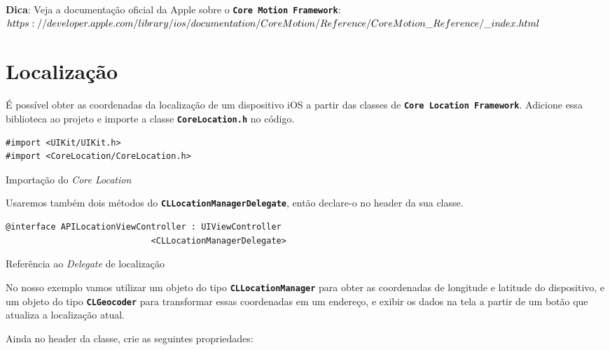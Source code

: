 \documentclass[a4paper,12pt,brazil,doubleside]{book}
\begin{document}
\begin{singlespace}
\begin{framed}

\textbf{Dica}: Veja a documentação oficial da Apple sobre o \texttt{\textbf{Core Motion Framework}}:\\
\(https://developer.apple.com/library/ios/documentation/CoreMotion/Reference/\\CoreMotion\_Reference/\_index.html\)

\end{framed}

\section{Localização}


É possível obter as coordenadas da localização de um dispositivo iOS a partir das classes de \texttt{\textbf{Core Location Framework}}. Adicione essa biblioteca ao projeto e importe a classe \texttt{\textbf{CoreLocation.h}} no código.

\begin{listing}[H]
\begin{verbatim}
#import <UIKit/UIKit.h>
#import <CoreLocation/CoreLocation.h>
\end{verbatim}
\caption{Importação do \emph{Core Location}}
\end{listing}


Usaremos também dois métodos do \texttt{\textbf{CLLocationManagerDelegate}}, então declare-o no header da sua classe.

\begin{listing}[H]
\begin{verbatim}
@interface APILocationViewController : UIViewController
                             <CLLocationManagerDelegate>
\end{verbatim}
\caption{Referência ao \emph{Delegate} de localização}
\end{listing}


No nosso exemplo vamos utilizar um objeto do tipo \texttt{\textbf{CLLocationManager}} para obter as coordenadas de longitude e latitude do dispositivo, e um objeto do tipo \texttt{\textbf{CLGeocoder}} para transformar essas coordenadas em um endereço, e exibir os dados na tela a partir de um botão que atualiza a localização atual.

Ainda no header da classe, crie as seguintes propriedades:


\end{singlespace}
\end{document}

